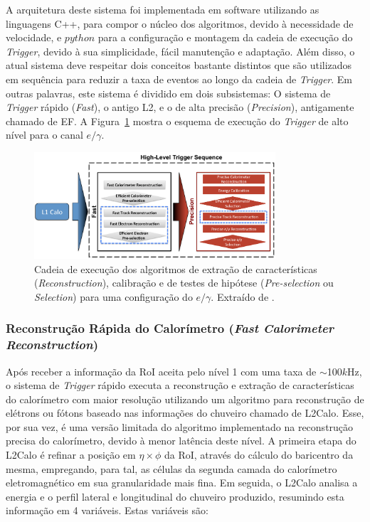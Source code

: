A arquitetura deste sistema foi implementada em software utilizando as linguagens C++, para compor o núcleo dos algoritmos, devido à necessidade de velocidade, e $python$
para a configuração e montagem da cadeia de execução do \textit{Trigger}, devido à sua simplicidade, fácil manutenção e adaptação.  Além disso, o atual sistema deve respeitar dois conceitos
bastante distintos que são utilizados em sequência para reduzir a taxa de eventos ao longo da cadeia de \textit{Trigger}.  Em outras palavras, este sistema é dividido em dois subsistemas: O sistema de \textit{Trigger} rápido (\textit{Fast}), o antigo L2, e o de alta precisão (\textit{Precision}), antigamente chamado de EF.  A Figura~\ref{fig:egammaChain} mostra o esquema de execução do \textit{Trigger} de alto nível para o canal $e/\gamma$. 

 
\begin{figure}[h!t]
\centering
\includegraphics[width=0.8\textwidth]{figures/egammaChain.pdf}
\caption[Cadeia de execução dos algoritmos de \textit{trigger} do $e/\gamma$. ]
{Cadeia de execução dos algoritmos de extração de características (\textit{Reconstruction}), calibração e de testes de hipótese (\textit{Pre-selection} ou \textit{Selection}) para uma
configuração do $e/\gamma$. Extraído de \cite{artigo_acat2016_joao}.}
\label{fig:egammaChain}
\end{figure}

\subsubsection{Reconstrução Rápida do Calorímetro (\textit{Fast Calorimeter Reconstruction})}

Após receber a informação da RoI aceita pelo nível 1 com uma taxa de $\sim$100$k$Hz, o sistema de \textit{Trigger} rápido executa a reconstrução e extração de características do calorímetro com 
maior resolução utilizando um algoritmo para reconstrução de elétrons ou fótons baseado nas informações do chuveiro chamado de L2Calo. Esse, por sua vez, é uma versão limitada do algoritmo 
implementado na reconstrução precisa do calorímetro, devido à menor latência deste nível. A primeira etapa do L2Calo é refinar a posição em $\eta\times\phi$ da RoI, através do cálculo do 
baricentro da mesma, empregando, para tal, as células da segunda camada do calorímetro eletromagnético em sua granularidade mais fina. Em seguida, o L2Calo analisa
a energia e o perfil lateral e longitudinal do chuveiro produzido, resumindo esta informação em 4 variáveis. Estas variáveis são:

